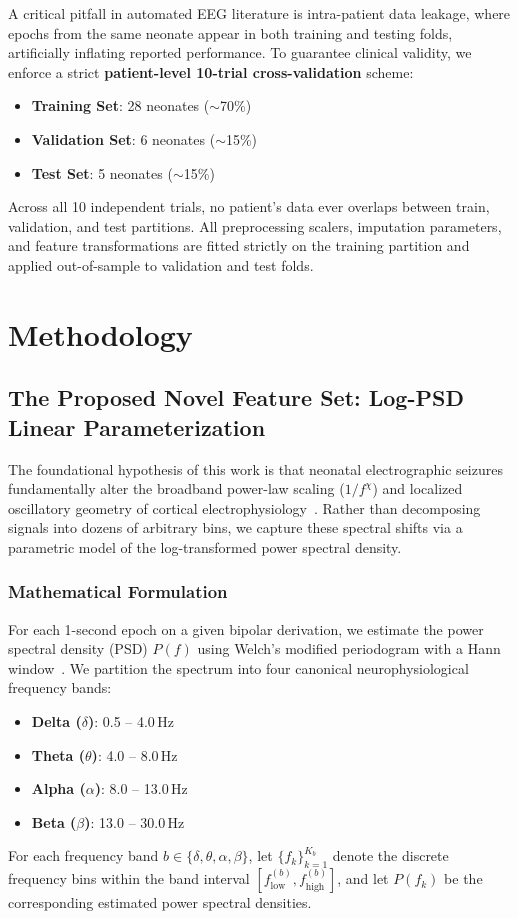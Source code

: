 \documentclass[10pt,twocolumn,letterpaper]{article}
\begin{document}
A critical pitfall in automated EEG literature is intra-patient data leakage, where epochs from the same neonate appear in both training and testing folds, artificially inflating reported performance. To guarantee clinical validity, we enforce a strict \textbf{patient-level 10-trial cross-validation} scheme:
\begin{itemize}
    \item \textbf{Training Set}: 28 neonates ($\sim$70\%)
    \item \textbf{Validation Set}: 6 neonates ($\sim$15\%)
    \item \textbf{Test Set}: 5 neonates ($\sim$15\%)
\end{itemize}
Across all 10 independent trials, no patient's data ever overlaps between train, validation, and test partitions. All preprocessing scalers, imputation parameters, and feature transformations are fitted strictly on the training partition and applied out-of-sample to validation and test folds.

\section{Methodology}\label{sec:methods}

\subsection{The Proposed Novel Feature Set: Log-PSD Linear Parameterization}\label{subsec:psd_method}

The foundational hypothesis of this work is that neonatal electrographic seizures fundamentally alter the broadband power-law scaling ($1/f^\chi$) and localized oscillatory geometry of cortical electrophysiology~\cite{donoghue2020,gao2017}. Rather than decomposing signals into dozens of arbitrary bins, we capture these spectral shifts via a parametric model of the log-transformed power spectral density.

\subsubsection{Mathematical Formulation}

For each 1-second epoch on a given bipolar derivation, we estimate the power spectral density (PSD) $P(f)$ using Welch's modified periodogram with a Hann window~\cite{welch1967}. We partition the spectrum into four canonical neurophysiological frequency bands:
\begin{itemize}
    \item \textbf{Delta ($\delta$)}: 0.5 -- 4.0\,Hz
    \item \textbf{Theta ($\theta$)}: 4.0 -- 8.0\,Hz
    \item \textbf{Alpha ($\alpha$)}: 8.0 -- 13.0\,Hz
    \item \textbf{Beta ($\beta$)}: 13.0 -- 30.0\,Hz
\end{itemize}
For each frequency band $b \in \{\delta, \theta, \alpha, \beta\}$, let $\{f_k\}_{k=1}^{K_b}$ denote the discrete frequency bins within the band interval $[f_{\text{low}}^{(b)}, f_{\text{high}}^{(b)}]$, and let $P(f_k)$ be the corresponding estimated power spectral densities.
\end{document}
